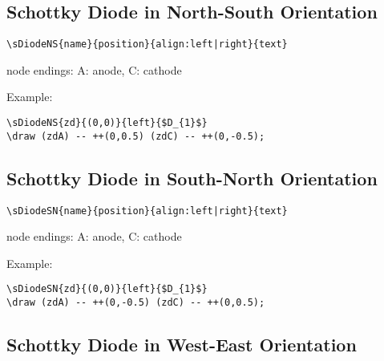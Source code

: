 \documentclass[parskip=full]{scrartcl}
\begin{document}
\subsection{Schottky Diode in North-South Orientation}

\begin{verbatim}
\sDiodeNS{name}{position}{align:left|right}{text}
\end{verbatim}
node endings: A: anode, C: cathode

Example:\\
\begin{minipage}{0.8\textwidth}
\begin{verbatim}
\sDiodeNS{zd}{(0,0)}{left}{$D_{1}$}
\draw (zdA) -- ++(0,0.5) (zdC) -- ++(0,-0.5);
\end{verbatim}
\end{minipage}
\begin{minipage}{0.19\textwidth}
\end{minipage}

\subsection{Schottky Diode in South-North Orientation}

\begin{verbatim}
\sDiodeSN{name}{position}{align:left|right}{text}
\end{verbatim}
node endings: A: anode, C: cathode

Example:\\
\begin{minipage}{0.8\textwidth}
\begin{verbatim}
\sDiodeSN{zd}{(0,0)}{left}{$D_{1}$}
\draw (zdA) -- ++(0,-0.5) (zdC) -- ++(0,0.5);
\end{verbatim}
\end{minipage}
\begin{minipage}{0.19\textwidth}
\end{minipage}

\subsection{Schottky Diode in West-East Orientation}
\end{document}
